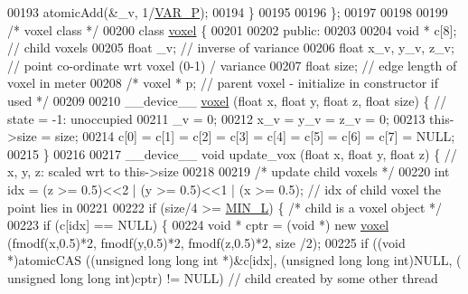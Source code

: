 \begin{DoxyCode}
{00193         atomicAdd(&\_v, 1/\hyperlink{Voxel_8hpp_ae1cd6283839fc3aebf9bccbd1044a365}{VAR\_P});
00194     \}
00195 
00196 \};
00197 
00198 
00199 \textcolor{comment}{/* voxel class */}
00200 \textcolor{keyword}{class }\hyperlink{classvoxel}{voxel} \{
00201 
00202 \textcolor{keyword}{public}:
00203 
00204     \textcolor{keywordtype}{void} * c[8]; \textcolor{comment}{// child voxels}
00205     \textcolor{keywordtype}{float} \_v; \textcolor{comment}{// inverse of variance}
00206     \textcolor{keywordtype}{float} x\_v, y\_v, z\_v; \textcolor{comment}{// point co-ordinate wrt voxel (0-1) / variance}
00207     \textcolor{keywordtype}{float} size; \textcolor{comment}{// edge length of voxel in meter}
00208     \textcolor{comment}{/* voxel * p; // parent voxel - initialize in constructor if used */}
00209 
00210     \_\_device\_\_ \hyperlink{classvoxel}{voxel} (\textcolor{keywordtype}{float} x, \textcolor{keywordtype}{float} y, \textcolor{keywordtype}{float} z, \textcolor{keywordtype}{float} size) \{ \textcolor{comment}{// state = -1: unoccupied}
00211         \_v = 0;
00212         x\_v = y\_v = z\_v = 0;
00213         this->size = size;
00214         c[0] = c[1] = c[2] = c[3] = c[4] = c[5] = c[6] = c[7] = NULL;
00215     \}
00216 
00217     \_\_device\_\_ \textcolor{keywordtype}{void} update\_vox (\textcolor{keywordtype}{float} x, \textcolor{keywordtype}{float} y, \textcolor{keywordtype}{float} z) \{ \textcolor{comment}{// x, y, z: scaled wrt to this->size}
00218 
00219         \textcolor{comment}{/* update child voxels */}
00220         \textcolor{keywordtype}{int} idx = (z >= 0.5)<<2 | (y >= 0.5)<<1 | (x >= 0.5); \textcolor{comment}{// idx of child voxel the point lies in}
00221 
00222         \textcolor{keywordflow}{if} (size/4 >= \hyperlink{Voxel_8hpp_a29d8f4bb35f9fa62e1d680bc6ab1f4f1}{MIN\_L}) \{ \textcolor{comment}{/* child is a voxel object */}
00223             \textcolor{keywordflow}{if} (c[idx] == NULL) \{
00224                 \textcolor{keywordtype}{void} * cptr = (\textcolor{keywordtype}{void} *) \textcolor{keyword}{new} \hyperlink{classvoxel}{voxel} (fmodf(x,0.5)*2, fmodf(y,0.5)*2, fmodf(z,0.5)*2, size
      /2);
00225                 \textcolor{keywordflow}{if} ((\textcolor{keywordtype}{void} *)atomicCAS ((\textcolor{keywordtype}{unsigned} \textcolor{keywordtype}{long} \textcolor{keywordtype}{long} \textcolor{keywordtype}{int} *)&c[idx], (\textcolor{keywordtype}{unsigned} \textcolor{keywordtype}{long} \textcolor{keywordtype}{long} \textcolor{keywordtype}{int})NULL, (\textcolor{keywordtype}{
      unsigned} \textcolor{keywordtype}{long} \textcolor{keywordtype}{long} \textcolor{keywordtype}{int})cptr) != NULL) \textcolor{comment}{// child created by some other thread}
}
\end{DoxyCode}
